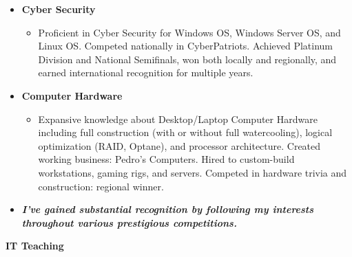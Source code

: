 \documentclass[10pt]{article}
\newenvironment{outerlist}[1][\enskip\textbullet]%
        {\begin{itemize}[#1,leftmargin=*]}{\end{itemize}%
         \vspace{-.6\baselineskip}}
\newenvironment{innerlist}[1][\enskip\textbullet]%
        {\begin{itemize}[#1,leftmargin=*,parsep=0pt,itemsep=0pt,topsep=0pt,partopsep=0pt]}
        {\end{itemize}}
\begin{document}
\begin{outerlist}
\item[] \textbf{Cyber Security}
\begin{innerlist}
\item[] Proficient in Cyber Security for Windows OS, Windows Server OS, and Linux OS. Competed nationally in CyberPatriots. Achieved Platinum Division and National Semifinals, won both locally and regionally, and earned international recognition for multiple years. 
\end{innerlist}
\item[]  \textbf{Computer Hardware}
\begin{innerlist}
\item[] Expansive knowledge about Desktop/Laptop Computer Hardware including full construction (with or without full watercooling), logical optimization (RAID, Optane), and processor architecture. Created working business: Pedro's Computers. Hired to custom-build workstations, gaming rigs, and servers. Competed in hardware trivia and construction: regional winner.
\end{innerlist}
\item[] \textbf{\emph{I've gained substantial recognition by following my interests throughout various prestigious competitions.}}
\end{outerlist}
\vspace{.1in}
\textbf{IT Teaching}
\end{document}
